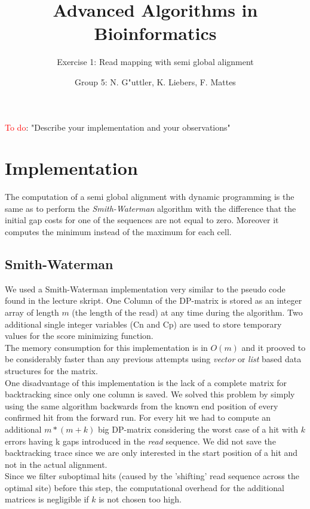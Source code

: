\documentclass[11pt, notitlepage]{scrartcl}
\begin{document}
         


\title{Advanced Algorithms in Bioinformatics} 
\subtitle{Exercise 1: Read mapping with semi global alignment}
\author{Group 5: N. G"uttler, K. Liebers, F. Mattes} %
\maketitle


\textcolor{red}{To do}: "Describe your implementation and your observations"

\section{Implementation}
The computation of a semi global alignment with dynamic programming is the same as to perform the \textit{Smith-Waterman} algorithm with the difference 
that the initial gap costs for one of the sequences are not equal to zero. Moreover it computes the minimum instead of the maximum for each cell.\\

\subsection{Smith-Waterman}
We used a Smith-Waterman implementation very similar to the pseudo code found in the lecture skript. One Column of the DP-matrix is stored as an integer array
of length $m$ (the length of the read) at any time during the algorithm. Two additional single integer variables (Cn and Cp) are used to store temporary values
for the score minimizing function.\\
The memory consumption for this implementation is in $O(m)$ and it prooved to be considerably faster than any previous attempts using {\it vector} or {\it list} based data structures for the matrix.\\
One disadvantage of this implementation is the lack of a complete matrix for backtracking since only one column is saved. We solved this problem
by simply using the same algorithm backwards from the known end position of every confirmed hit from the forward run. For every hit we had to compute an additional $m*(m+k)$ big DP-matrix
considering the worst case of a hit with $k$ errors having k gaps introduced in the {\it read} sequence. We did not save the backtracking trace since we are only interested
in the start position of a hit and not in the actual alignment. \\
Since we filter suboptimal hits (caused by the 'shifting' read sequence across the optimal site) before this step, the computational overhead for the additional matrices is 
negligible if $k$ is not chosen too high.\\
 
\end{document}
